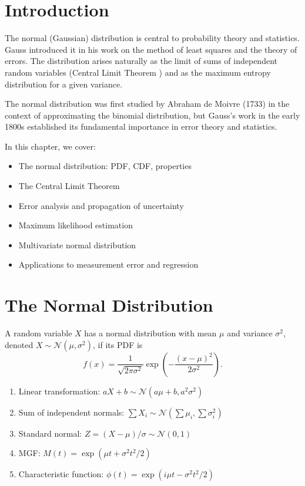 \section{Introduction}

The normal (Gaussian) distribution  is central to probability theory and statistics. Gauss introduced it in his work on the method of least squares and the theory of errors. The distribution arises naturally as the limit of sums of independent random variables (Central Limit Theorem ) and as the maximum entropy  distribution for a given variance.

The normal distribution was first studied by Abraham de Moivre (1733) in the context of approximating the binomial distribution, but Gauss's work in the early 1800s established its fundamental importance in error theory and statistics.

In this chapter, we cover:
\begin{itemize}
    \item The normal distribution: PDF, CDF, properties
    \item The Central Limit Theorem
    \item Error analysis and propagation of uncertainty
    \item Maximum likelihood estimation
    \item Multivariate normal distribution
    \item Applications to measurement error and regression
\end{itemize}

\section{The Normal Distribution}

\begin{definition}
A random variable $X$ has a normal distribution with mean $\mu$ and variance $\sigma^2$, denoted $X \sim \mathcal{N}(\mu, \sigma^2)$, if its PDF is
\[
f(x) = \frac{1}{\sqrt{2\pi\sigma^2}} \exp\left(-\frac{(x-\mu)^2}{2\sigma^2}\right).
\]
\end{definition}

\begin{theorem}[Properties]
\begin{enumerate}
    \item Linear transformation: $aX + b \sim \mathcal{N}(a\mu+b, a^2\sigma^2)$
    \item Sum of independent normals: $\sum X_i \sim \mathcal{N}(\sum\mu_i, \sum\sigma_i^2)$
    \item Standard normal: $Z = (X-\mu)/\sigma \sim \mathcal{N}(0,1)$
    \item MGF: $M(t) = \exp(\mu t + \sigma^2 t^2/2)$
    \item Characteristic function: $\phi(t) = \exp(i\mu t - \sigma^2 t^2/2)$
\end{enumerate}
\end{theorem}


